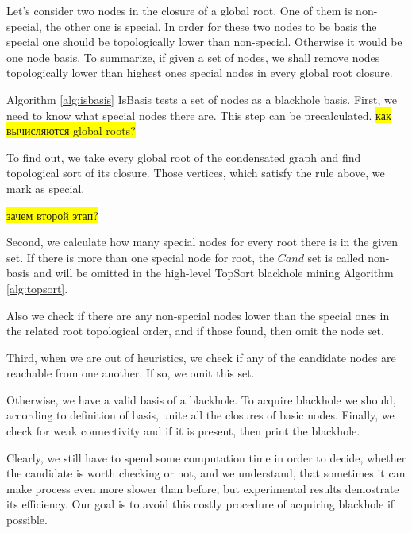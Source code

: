 \documentclass{svproc}
\newcommand{\FIXME}[1]{ %
	\colorbox{yellow}{#1}
}
\newcommand{\FIXME}[1]{ %
}
\begin{document}
Let's consider two nodes in the closure of a global root. One of them is non-special, the other one is special. In order for these two nodes to be basis
the special one should be topologically lower than non-special. Otherwise it would be one node basis.
To summarize, if given a set of nodes, we shall remove nodes topologically lower than highest ones special nodes in every global root closure.


Algorithm \ref{alg:isbasis} IsBasis tests a set of nodes as a blackhole basis. 
First, we need to know what special nodes there are. This step can be precalculated. 
\FIXME{как вычисляются global roots?}
To find out, we take every global root of the condensated graph and find topological sort of its closure.
Those vertices, which satisfy the rule above, we mark as special.

\FIXME{зачем второй этап?}
Second, we calculate how many special nodes for every root there is in the given set. If there is more than one special node for root, the $Cand$ set is called non-basis and will be omitted in the high-level TopSort blackhole mining Algorithm \ref{alg:topsort}.


Also we check if there are any non-special nodes lower than the special ones in the related root topological order, and if those found, then omit the node set.

Third, when we are out of heuristics, we check if any of the candidate nodes are reachable from one another. If so, we omit this set. 

 
Otherwise, we have a valid basis of a blackhole.
To acquire blackhole we should, according to definition of basis, unite all the closures of basic nodes.
Finally, we check for weak connectivity and if it is present, then print the blackhole.

Clearly, we still have to spend some computation time in order to decide, whether
the candidate is worth checking or not, and we understand, that sometimes it can make process even more slower than before, but experimental results demostrate its efficiency.
Our goal is to avoid this costly procedure of acquiring blackhole if possible.
\end{document}
